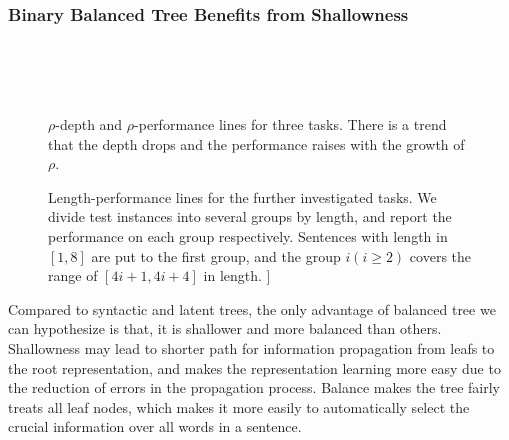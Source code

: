 \documentclass[11pt,a4paper]{article}
\begin{document}
\subsubsection{Binary Balanced Tree Benefits from Shallowness}
\label{sec:balanced-better}
\begin{figure}[t!]
    \centering
    ~~
    \\
    ~~
    \\
    ~~
    \caption{\label{fig:tree-depth-performance} $\rho$-depth and $\rho$-performance lines for three tasks. 
    There is a trend that the depth drops and the performance raises with the growth of $\rho$. }
\end{figure}   

\begin{figure*}[t!]
    \centering
    \caption{\label{fig:length-performance} Length-performance lines for the further investigated tasks. We divide test instances into several groups by length, and report the performance on each group respectively. Sentences with length in $[1,8]$ are put to the first group, and the group $i (i\geq 2)$ covers the range of $[4i+1, 4i+4]$ in length. ]}
\end{figure*}

Compared to syntactic and latent trees, the only advantage of balanced tree we can hypothesize is that, it is shallower and more balanced than others.
Shallowness may lead to shorter path for information propagation from leafs to the root representation, and makes the representation learning more easy due to the reduction of errors in the propagation process.
Balance makes the tree fairly treats all leaf nodes, which makes it more easily to automatically select the crucial information over all words in a sentence.  
\end{document}
